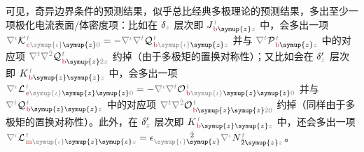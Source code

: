 可见，奇异边界条件的预测结果，似乎总比经典多极理论的预测结果，多出至少一项极化电流表面/体密度项：比如在 ${\delta}_{\mathcolor{gray}{z}}$ 层次即 ${J}^{\;\!\mathcolor{gray}{t}}_{\;\!\textcolor{Maroon}{\text{b}} \symup{z} \mathcolor{gray}{z}}$ 中，会多出一项 $\mathcolor{gray}{\nabla^\iota} {\mathcal{K}}^{\;\!\mathcolor{gray}{t}}_{\;\!\textcolor{Maroon}{\text{e}} \mathcolor{gray}{\symup{\iota}} \symup{z}\mathcolor{gray}{0}} = - \mathcolor{gray}{\nabla^\iota} \mathcolor{gray}{\nabla^t} {\mathcal{Q}}^{\;\!\mathcolor{gray}{t}}_{\;\!\textcolor{Maroon}{\text{b}} \mathcolor{gray}{\symup{\iota}} \symup{z} \mathcolor{gray}{z}}$ 并与 $\mathcolor{gray}{\nabla^t} {\mathcal{P}}^{\;\!\mathcolor{gray}{t}}_{\;\!\textcolor{Maroon}{\text{b}} \symup{z} \mathcolor{gray}{z}}$ 中的对应项 $\mathcolor{gray}{\nabla^t} \mathcolor{gray}{\nabla^{\hat{2}}} {\mathcal{Q}}^{\;\!\mathcolor{gray}{t}}_{\;\!\textcolor{Maroon}{\text{b}} \symup{z} \mathcolor{gray}{\hat{2}} \mathcolor{gray}{z}}$ 约掉（由于多极矩的置换对称性\cite{raabMultipoleTheoryElectromagnetism2004}）；又比如会在 ${\delta}'_{\mathcolor{gray}{z}}$ 层次即 ${K}^{\;\!\mathcolor{gray}{t}}_{\;\!\textcolor{Maroon}{\text{b}} \symup{z} \symup{z} \mathcolor{gray}{z}}$ 中，会多出一项 $\mathcolor{gray}{\nabla^\iota} {\mathcal{L}}^{\;\!\mathcolor{gray}{t}}_{\;\!\textcolor{Maroon}{\text{e}} \mathcolor{gray}{\symup{\iota}} \symup{z} \symup{z} \mathcolor{gray}{0}} = - \mathcolor{gray}{\nabla^\iota} \mathcolor{gray}{\nabla^t} {\mathcal{O}}^{\;\!\mathcolor{gray}{t}}_{\;\!\textcolor{Maroon}{\text{b}} \mathcolor{gray}{\symup{\iota}} \symup{z} \symup{z} \mathcolor{gray}{0}}$ 并与 $\mathcolor{gray}{\nabla^t} {\mathcal{Q}}^{\;\!\mathcolor{gray}{t}}_{\;\!\textcolor{Maroon}{\text{b}} \symup{z} \symup{z} \mathcolor{gray}{z}}$ 中的对应项 $\mathcolor{gray}{\nabla^t} \mathcolor{gray}{\nabla^{\hat{2}}} {\mathcal{O}}^{\;\!\mathcolor{gray}{t}}_{\;\!\textcolor{Maroon}{\text{b}} \symup{z} \symup{z} \mathcolor{gray}{\hat{2}} \mathcolor{gray}{0}}$ 约掉（同样由于多极矩的置换对称性）。此外，在 ${\delta}'_{\mathcolor{gray}{z}}$ 层次即 ${K}^{\;\!\mathcolor{gray}{t}}_{\;\!\textcolor{Maroon}{\text{b}} \symup{z} \symup{z} \mathcolor{gray}{z}}$ 中，还会多出一项 $\mathcolor{gray}{\nabla^\iota} {\mathcal{L}}^{\;\!\mathcolor{gray}{t}}_{\;\!\textcolor{Maroon}{\text{m}} \mathcolor{gray}{\symup{\iota}} \symup{z} \symup{z} \mathcolor{gray}{z}} = \epsilon^{\hphantom{\symup{\iota}\hat{1}}\hat{2}}_{\mathcolor{gray}{\symup{\iota}} \symup{z}} \mathcolor{gray}{\nabla^\iota} N^{\;\!\mathcolor{gray}{t}}_{\;\! \hat{2}\symup{z}\mathcolor{gray}{z}}$。

